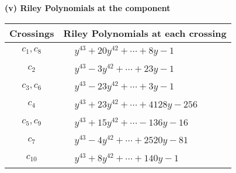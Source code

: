 \documentclass[1p]{elsarticle_modified}
\theoremstyle{definition}
\begin{document}
\newpage\renewcommand{\arraystretch}{1}
\flushleft \textbf{(v) Riley Polynomials at the component}\newline \\
\begin{tabular}{m{50pt}|m{274pt}}
Crossings & \hspace{64pt}Riley Polynomials at each crossing \\
\hline $$\begin{aligned}c_{1},c_{8}\end{aligned}$$&$\begin{aligned}
&y^{43}+20 y^{42}+\cdots+8 y-1
\end{aligned}$\\
\hline $$\begin{aligned}c_{2}\end{aligned}$$&$\begin{aligned}
&y^{43}-3 y^{42}+\cdots+23 y-1
\end{aligned}$\\
\hline $$\begin{aligned}c_{3},c_{6}\end{aligned}$$&$\begin{aligned}
&y^{43}-23 y^{42}+\cdots+3 y-1
\end{aligned}$\\
\hline $$\begin{aligned}c_{4}\end{aligned}$$&$\begin{aligned}
&y^{43}+23 y^{42}+\cdots+4128 y-256
\end{aligned}$\\
\hline $$\begin{aligned}c_{5},c_{9}\end{aligned}$$&$\begin{aligned}
&y^{43}+15 y^{42}+\cdots-136 y-16
\end{aligned}$\\
\hline $$\begin{aligned}c_{7}\end{aligned}$$&$\begin{aligned}
&y^{43}-4 y^{42}+\cdots+2520 y-81
\end{aligned}$\\
\hline $$\begin{aligned}c_{10}\end{aligned}$$&$\begin{aligned}
&y^{43}+8 y^{42}+\cdots+140 y-1
\end{aligned}$\\
\hline
\end{tabular}\\~\\
\end{document}
